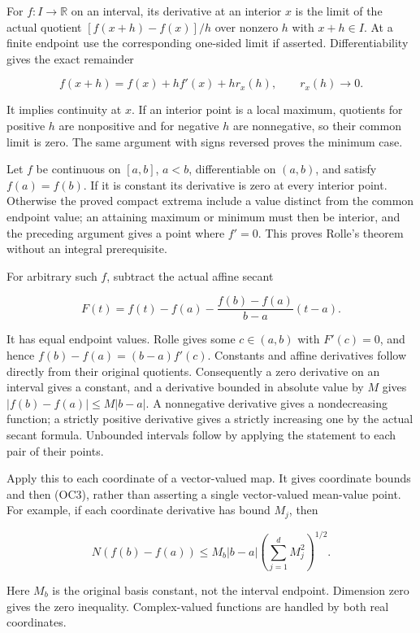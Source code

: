 \documentclass[
  11pt,
]{article}
\begin{document}
For \(f:I\to\mathbb R\) on an interval, its derivative at an interior
\(x\) is the limit of the actual quotient \([f(x+h)-f(x)]/h\) over
nonzero \(h\) with \(x+h\in I\). At a finite endpoint use the
corresponding one-sided limit if asserted. Differentiability gives the
exact remainder

\[
 f(x+h)=f(x)+h f'(x)+h r_x(h),
 \qquad r_x(h)\longrightarrow0.
\tag{OC4}
\]

It implies continuity at \(x\). If an interior point is a local maximum,
quotients for positive \(h\) are nonpositive and for negative \(h\) are
nonnegative, so their common limit is zero. The same argument with signs
reversed proves the minimum case.

Let \(f\) be continuous on \([a,b]\), \(a<b\), differentiable on
\((a,b)\), and satisfy \(f(a)=f(b)\). If it is constant its derivative
is zero at every interior point. Otherwise the proved compact extrema
include a value distinct from the common endpoint value; an attaining
maximum or minimum must then be interior, and the preceding argument
gives a point where \(f'=0\). This proves Rolle's theorem without an
integral prerequisite.

For arbitrary such \(f\), subtract the actual affine secant

\[
 F(t)=f(t)-f(a)-\frac{f(b)-f(a)}{b-a}(t-a).
\tag{OC5}
\]

It has equal endpoint values. Rolle gives some \(c\in(a,b)\) with
\(F'(c)=0\), and hence \(f(b)-f(a)=(b-a)f'(c)\). Constants and affine
derivatives follow directly from their original quotients. Consequently
a zero derivative on an interval gives a constant, and a derivative
bounded in absolute value by \(M\) gives \(|f(b)-f(a)|\le M|b-a|\). A
nonnegative derivative gives a nondecreasing function; a strictly
positive derivative gives a strictly increasing one by the actual secant
formula. Unbounded intervals follow by applying the statement to each
pair of their points.

Apply this to each coordinate of a vector-valued map. It gives
coordinate bounds and then (OC3), rather than asserting a single
vector-valued mean-value point. For example, if each coordinate
derivative has bound \(M_j\), then

\[
 N(f(b)-f(a))
 \le M_b |b-a|\left(\sum_{j=1}^d M_j^2\right)^{1/2}.
\tag{OC6}
\]

Here \(M_b\) is the original basis constant, not the interval endpoint.
Dimension zero gives the zero inequality. Complex-valued functions are
handled by both real coordinates.
\end{document}
